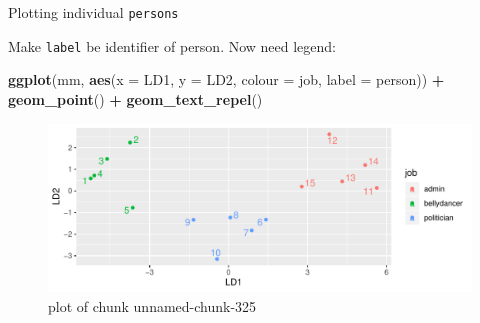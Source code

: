 \documentclass[ignorenonframetext,]{beamer}
\newenvironment{Shaded}{\begin{snugshade}}{\end{snugshade}}
\newcommand{\DataTypeTok}[1]{\textcolor[rgb]{0.13,0.29,0.53}{#1}}
\newcommand{\KeywordTok}[1]{\textcolor[rgb]{0.13,0.29,0.53}{\textbf{#1}}}
\newcommand{\NormalTok}[1]{#1}
\newcommand{\OperatorTok}[1]{\textcolor[rgb]{0.81,0.36,0.00}{\textbf{#1}}}
\newcommand{\StringTok}[1]{\textcolor[rgb]{0.31,0.60,0.02}{#1}}
\begin{document}
\begin{frame}[fragile]{Plotting individual \texttt{persons}}
\protect\hypertarget{plotting-individual-persons}{}

Make \texttt{label} be identifier of person. Now need legend:

\begin{Shaded}
\begin{Highlighting}[]
\KeywordTok{ggplot}\NormalTok{(mm, }\KeywordTok{aes}\NormalTok{(}\DataTypeTok{x =}\NormalTok{ LD1, }\DataTypeTok{y =}\NormalTok{ LD2,  }\DataTypeTok{colour =}\NormalTok{ job, }
               \DataTypeTok{label =}\NormalTok{ person)) }\OperatorTok{+}\StringTok{ }
\StringTok{  }\KeywordTok{geom_point}\NormalTok{() }\OperatorTok{+}\StringTok{ }\KeywordTok{geom_text_repel}\NormalTok{()}
\end{Highlighting}
\end{Shaded}

\begin{figure}
\centering
\includegraphics{figure/unnamed-chunk-325-1.pdf}
\caption{plot of chunk unnamed-chunk-325}
\end{figure}

\end{frame}
\end{document}
